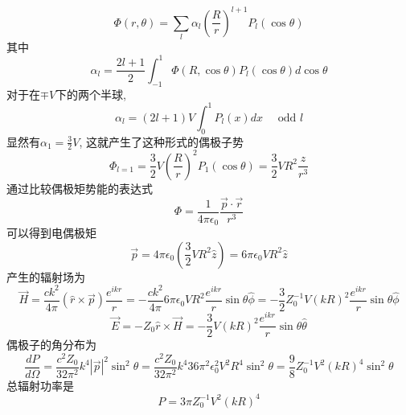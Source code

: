 \documentclass[UTF8,9pt]{ctexart}
\begin{document}
$$ 
\Phi(r, \theta)=\sum_{l} \alpha_{l}\left(\frac{R}{r}\right)^{l+1} P_{l}(\cos \theta)
 $$
 其中
 $$ 
\alpha_{l}=\frac{2 l+1}{2} \int_{-1}^{1} \Phi(R, \cos \theta) P_{l}(\cos \theta) d \cos \theta
 $$
 对于在$\mp V$下的两个半球, $$ 
 \alpha_{l}=(2 l+1) V \int_{0}^{1} P_{l}(x) d x \quad \text { odd } l
  $$
  显然有$\alpha_{1}=\frac{3}{2} V$, 这就产生了这种形式的偶极子势$$ 
  \Phi_{l=1}=\frac{3}{2} V\left(\frac{R}{r}\right)^{2} P_{1}(\cos \theta)=\frac{3}{2} V R^{2} \frac{z}{r^{3}}
   $$
   通过比较偶极矩势能的表达式$$ 
   \Phi=\frac{1}{4 \pi \epsilon_{0}} \frac{\vec{p} \cdot \vec{r}}{r^{3}}
    $$
    可以得到电偶极矩
    $$ 
\vec{p}=4 \pi \epsilon_{0}\left(\frac{3}{2} V R^{2} \hat{z}\right)=6 \pi \epsilon_{0} V R^{2} \hat{z}
 $$
 产生的辐射场为$$ 
 \vec{H}=\frac{c k^{2}}{4 \pi}(\hat{r} \times \vec{p}) \frac{e^{i k r}}{r}=-\frac{c k^{2}}{4 \pi} 6 \pi \epsilon_{0} V R^{2} \frac{e^{i k r}}{r} \sin \theta \hat{\phi}=-\frac{3}{2} Z_{0}^{-1} V(k R)^{2} \frac{e^{i k r}}{r} \sin \theta \hat{\phi}
  $$
  $$ 
\vec{E}=-Z_{0} \hat{r} \times \vec{H}=-\frac{3}{2} V(k R)^{2} \frac{e^{i k r}}{r} \sin \theta \hat{\theta}
 $$
 偶极子的角分布为
 $$ 
\frac{d P}{d \Omega}=\frac{c^{2} Z_{0}}{32 \pi^{2}} k^{4}|\vec{p}|^{2} \sin ^{2} \theta=\frac{c^{2} Z_{0}}{32 \pi^{2}} k^{4} 36 \pi^{2} \epsilon_{0}^{2} V^{2} R^{4} \sin ^{2} \theta=\frac{9}{8} Z_{0}^{-1} V^{2}(k R)^{4} \sin ^{2} \theta
 $$总辐射功率是$$ 
 P=3 \pi Z_{0}^{-1} V^{2}(k R)^{4}
  $$
\end{document}
